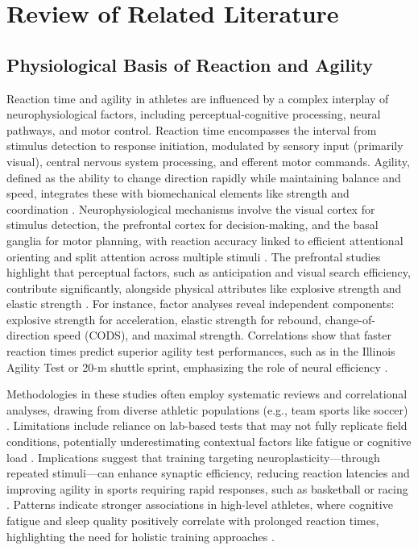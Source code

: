 \chapter{Review of Related Literature}
\label{sec:relatedlit}


\section{Physiological Basis of Reaction and Agility}

Reaction time and agility in athletes are influenced by a complex interplay of neurophysiological factors, including perceptual-cognitive processing, neural pathways, and motor control. Reaction time encompasses the interval from stimulus detection to response initiation, modulated by sensory input (primarily visual), central nervous system processing, and efferent motor commands. Agility, defined as the ability to change direction rapidly while maintaining balance and speed, integrates these with biomechanical elements like strength and coordination \cite{Pojskic:2019:RVU}. Neurophysiological mechanisms involve the visual cortex for stimulus detection, the prefrontal cortex for decision-making, and the basal ganglia for motor planning, with reaction accuracy linked to efficient attentional orienting and split attention across multiple stimuli \cite{Chow:2022:RTP}. The prefrontal studies highlight that perceptual factors, such as anticipation and visual search efficiency, contribute significantly, alongside physical attributes like explosive strength and elastic strength \cite{Yildiz:2020:RRA}. For instance, factor analyses reveal independent components: explosive strength for acceleration, elastic strength for rebound, change-of-direction speed (CODS), and maximal strength. Correlations show that faster reaction times predict superior agility test performances, such as in the Illinois Agility Test or 20-m shuttle sprint, emphasizing the role of neural efficiency \cite{Wang:2024:TME}.

Methodologies in these studies often employ systematic reviews and correlational analyses, drawing from diverse athletic populations (e.g., team sports like soccer) \cite{Turna:2020:EAT}. Limitations include reliance on lab-based tests that may not fully replicate field conditions, potentially underestimating contextual factors like fatigue or cognitive load \cite{Pojskic:2019:RVU}. Implications suggest that training targeting neuroplasticity—through repeated stimuli—can enhance synaptic efficiency, reducing reaction latencies and improving agility in sports requiring rapid responses, such as basketball or racing \cite{Chow:2022:RTP}. Patterns indicate stronger associations in high-level athletes, where cognitive fatigue and sleep quality positively correlate with prolonged reaction times, highlighting the need for holistic training approaches \cite{Yildiz:2020:RRA}.


